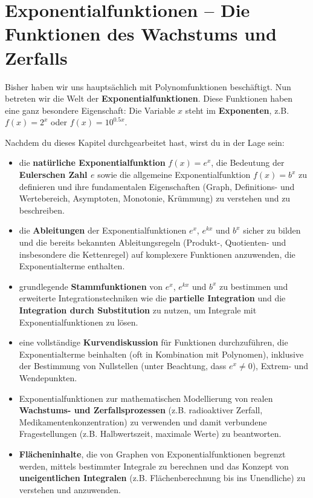 \section{Exponentialfunktionen – Die Funktionen des Wachstums und Zerfalls}
\label{sec:exponentialfunktionen_intro}

Bisher haben wir uns hauptsächlich mit Polynomfunktionen beschäftigt. Nun betreten wir die Welt der \textbf{Exponentialfunktionen}. Diese Funktionen haben eine ganz besondere Eigenschaft: Die Variable $x$ steht im \textbf{Exponenten}, z.B. $f(x) = 2^x$ oder $f(x) = 10^{0.5x}$.

\begin{tcolorbox}[colback=blue!5!white, colframe=blue!75!black, title=Was du in diesem Kapitel lernen wirst:]
Nachdem du dieses Kapitel durchgearbeitet hast, wirst du in der Lage sein:
\begin{itemize}[noitemsep, topsep=0pt, leftmargin=*, itemsep=2pt]
    \item die \textbf{natürliche Exponentialfunktion} $f(x)=e^x$, die Bedeutung der \textbf{Eulerschen Zahl $e$} sowie die allgemeine Exponentialfunktion $f(x)=b^x$ zu definieren und ihre fundamentalen Eigenschaften (Graph, Definitions- und Wertebereich, Asymptoten, Monotonie, Krümmung) zu verstehen und zu beschreiben.
    \item die \textbf{Ableitungen} der Exponentialfunktionen $e^x$, $e^{kx}$ und $b^x$ sicher zu bilden und die bereits bekannten Ableitungsregeln (Produkt-, Quotienten- und insbesondere die Kettenregel) auf komplexere Funktionen anzuwenden, die Exponentialterme enthalten.
    \item grundlegende \textbf{Stammfunktionen} von $e^x$, $e^{kx}$ und $b^x$ zu bestimmen und erweiterte Integrationstechniken wie die \textbf{partielle Integration} und die \textbf{Integration durch Substitution} zu nutzen, um Integrale mit Exponentialfunktionen zu lösen.
    \item eine vollständige \textbf{Kurvendiskussion} für Funktionen durchzuführen, die Exponentialterme beinhalten (oft in Kombination mit Polynomen), inklusive der Bestimmung von Nullstellen (unter Beachtung, dass $e^x \neq 0$), Extrem- und Wendepunkten.
    \item Exponentialfunktionen zur mathematischen Modellierung von realen \textbf{Wachstums- und Zerfallsprozessen} (z.B. radioaktiver Zerfall, Medikamentenkonzentration) zu verwenden und damit verbundene Fragestellungen (z.B. Halbwertszeit, maximale Werte) zu beantworten.
    \item \textbf{Flächeninhalte}, die von Graphen von Exponentialfunktionen begrenzt werden, mittels bestimmter Integrale zu berechnen und das Konzept von \textbf{uneigentlichen Integralen} (z.B. Flächenberechnung bis ins Unendliche) zu verstehen und anzuwenden.

\end{itemize}
\end{tcolorbox}
